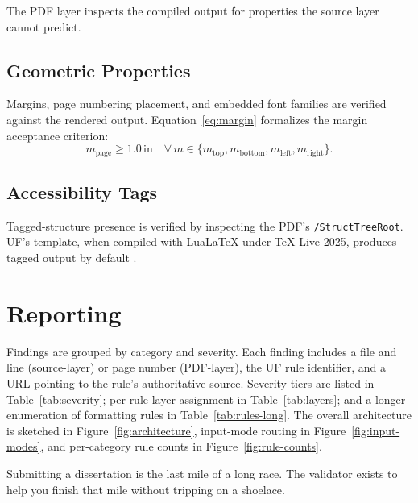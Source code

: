 The PDF layer inspects the compiled output for properties the source
layer cannot predict.

\subsection{Geometric Properties}

Margins, page numbering placement, and embedded font families are
verified against the rendered output. Equation~\ref{eq:margin}
formalizes the margin acceptance criterion:
\begin{equation}\label{eq:margin}
m_{\text{page}} \geq 1.0\,\text{in} \quad
\forall\,m \in \{m_{\text{top}}, m_{\text{bottom}}, m_{\text{left}}, m_{\text{right}}\}.
\end{equation}

\subsection{Accessibility Tags}

Tagged-structure presence is verified by inspecting the PDF's
\texttt{/StructTreeRoot}. UF's template, when compiled with LuaLaTeX
under TeX Live 2025, produces tagged output by default
\citep{ufitTemplates2026}.

\section{Reporting}\label{sec:reporting}

Findings are grouped by category and severity. Each finding includes a
file and line (source-layer) or page number (PDF-layer), the UF rule
identifier, and a URL pointing to the rule's authoritative source.
Severity tiers are listed in Table~\ref{tab:severity}; per-rule layer
assignment in Table~\ref{tab:layers}; and a longer enumeration of
formatting rules in Table~\ref{tab:rules-long}. The overall architecture
is sketched in Figure~\ref{fig:architecture}, input-mode routing in
Figure~\ref{fig:input-modes}, and per-category rule counts in
Figure~\ref{fig:rule-counts}.

Submitting a dissertation is the last mile of a long race. The
validator exists to help you finish that mile without tripping on a
shoelace.



